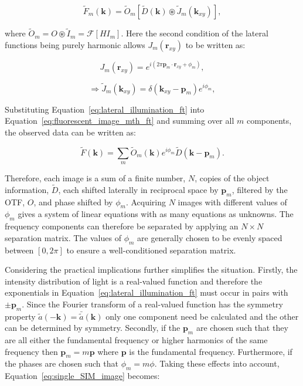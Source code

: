 \begin{equation}\label{eq:fluorescent_image_mth_ft}
\tilde{F}_{m}(\textbf{k}) = \tilde{O}_{m}\left[\tilde{D}(\textbf{k}) \circledast \tilde{J}_{m}(\textbf{k}_{xy})\right],
\end{equation}

where $\tilde{O}_{m} = O \circledast \tilde{I}_{m} = \mathcal{F}[HI_{m}]$.
Here the second condition of the lateral functions being purely harmonic allows
$J_{m}(\textbf{r}_{xy})$ to be written as:

\begin{equation}\label{eq:lateral_illumination}
J_{m}(\textbf{r}_{xy}) = e^{i\left(2\pi\textbf{p}_m\cdot\textbf{r}_{xy} + \phi_{m}\right)},
\end{equation}

\begin{equation}\label{eq:lateral_illumination_ft}
\Rightarrow \tilde{J}_{m}(\textbf{k}_{xy}) = \delta\left(\textbf{k}_{xy} - \textbf{p}_m\right)e^{i\phi_{m}},
\end{equation}

Substituting Equation~\ref{eq:lateral_illumination_ft} into 
Equation~\ref{eq:fluorescent_image_mth_ft} and summing over all $m$ components,
the observed data can be written as:

\begin{equation}\label{eq:single_SIM_image}
\tilde{F}(\textbf{k}) = \sum\limits_{m}{\tilde{O}_{m}(\textbf{k})e^{i\phi_{m}}\tilde{D}\left(\textbf{k} - \textbf{p}_m\right)}.
\end{equation}

Therefore, each image is a sum of a finite number, $N$, copies of the object 
information, $\tilde{D}$, each shifted laterally in reciprocal space by 
$\textbf{p}_{m}$, filtered by the OTF, $O$, and phase shifted by $\phi_{m}$.
Acquiring $N$ images with different values of $\phi_{m}$ gives a system of 
linear equations with as many equations as unknowns. The frequency components
can therefore be separated by applying an $N\times N$ separation matrix. The 
values of $\phi_{m}$ are generally chosen to be evenly spaced between 
$[0,2\pi]$ to ensure a well-conditioned separation 
matrix\cite{gustafsson2008three}.

Considering the practical implications further simplifies the situation. 
Firstly, the intensity distribution of light is a real-valued function and
therefore the exponentials in Equation~\ref{eq:lateral_illumination_ft} must
occur in pairs with $\pm\textbf{p}_{m}$. Since the Fourier transform of a 
real-valued function has the symmetry property $\tilde{a}(-\textbf{k}) = 
\bar{\tilde{a}}(\textbf{k})$ only one component need be calculated and the
other can be determined by symmetry. Secondly, if the $\textbf{p}_{m}$ are
chosen such that they are all either the fundamental frequency or higher 
harmonics of the same frequency then $\textbf{p}_{m} = m\textbf{p}$ where
$\textbf{p}$ is the fundamental frequency. Furthermore, if the phases are 
chosen such that $\phi_{m} = m\phi$. Taking these effects into account, 
Equation~\ref{eq:single_SIM_image} becomes:

